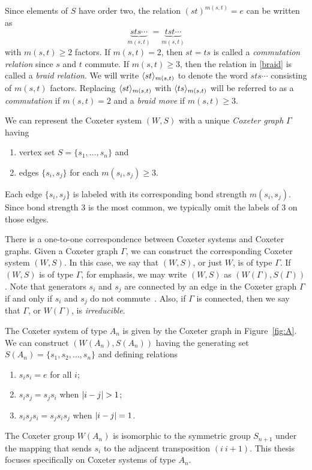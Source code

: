     Since elements of $S$ have order two, the relation $(st)^{m(s,t)} = e$ can be written as
\begin{equation}\label{braid} \underbrace{sts \cdots}_{m(s,t)} = \underbrace{tst \cdots}_{m(s,t)} \end{equation}
    with $m(s,t) \geq 2$ factors.
    If $m(s,t) = 2$, then $st = ts$ is called a \emph{commutation relation} since $s$ and $t$ commute. If $m(s,t) \geq 3$, then the relation in \eqref{braid} is called a \emph{braid relation}.
    We will write $\langle st \rangle_{m(s,t)}$ to denote the word $sts \cdots$ consisting of $m(s,t)$ factors.
    Replacing $\langle st \rangle_{m(s,t)}$ with $\langle ts \rangle_{m(s,t)}$ will be referred to as a \emph{commutation} if $m(s,t) = 2$ and a \emph{braid move} if $m(s,t) \geq 3$.
    
    We can represent the Coxeter system $(W,S)$ with a unique \emph{Coxeter graph} $\Gamma$ having
\begin{enumerate}[leftmargin=0.75in,label=(\alph*)]
    \item vertex set $S = \{s_1, \ldots, s_n\}$ and
    \item edges $\{s_i,s_j\}$ for each $m(s_i,s_j) \geq 3$.
\end{enumerate} 
    Each edge $\{s_i,s_j\}$ is labeled with its corresponding bond strength $m(s_i,s_j)$. Since bond strength 3 is the most common, we typically omit the labels of 3 on those edges.
    
    There is a one-to-one correspondence between Coxeter systems and Coxeter graphs.
    Given a Coxeter graph $\Gamma$, we can construct the corresponding Coxeter system $(W,S)$.
    In this case, we say that $(W,S)$, or just $W$, is of type $\Gamma$. If $(W,S)$ is of type $\Gamma$, for emphasis, we may write $(W,S)$ as $(W(\Gamma),S(\Gamma))$.
    Note that generators $s_i$ and $s_j$ are connected by an edge in the Coxeter graph $\Gamma$ if and only if $s_i$ and $s_j$ do not commute~\cite{Humphreys1990}.
    Also, if $\Gamma$ is connected, then we say that $\Gamma$, or $W(\Gamma)$, is \emph{irreducible}.

    The Coxeter system of type $A_n$ is given by the Coxeter graph in Figure~\ref{fig:A}. We can construct $(W(A_n),S(A_n))$ having the generating set $S(A_n) = \{s_1, s_2, \ldots, s_n\}$ and defining relations
\begin{enumerate}[leftmargin=0.75in, label=(\alph*)]
    \item $s_is_i = e$ for all $i$;
    \item $s_is_j = s_js_i$ when $\left\lvert i-j\right\rvert > 1$;
    \item $s_is_js_i = s_js_is_j$ when $\left\lvert i-j\right\rvert = 1$.
\end{enumerate}
    The Coxeter group $W(A_n)$ is isomorphic to the symmetric group $S_{n+1}$ under the mapping that sends $s_i$ to the adjacent transposition $(i~i+1)$.
    This thesis focuses specifically on Coxeter systems of type $A_n$.

